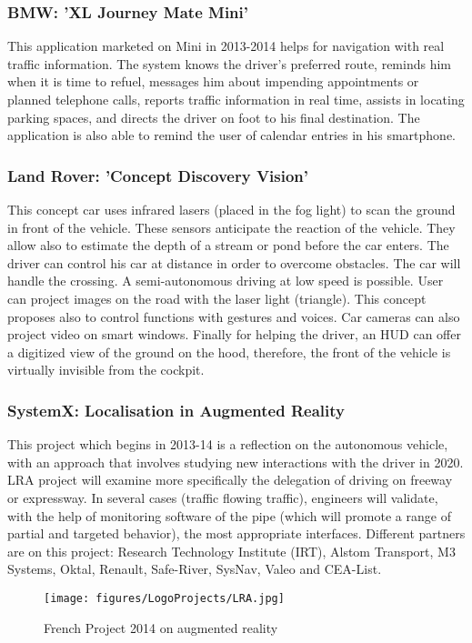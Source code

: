\documentclass[a4paper]{article}
\begin{document}
\subsubsection{BMW: 'XL Journey Mate Mini'}

This application marketed on Mini in 2013-2014 helps for navigation with real traffic information. The system knows the driver's preferred route, reminds him when it is time to refuel, messages him about impending appointments or planned telephone calls, reports traffic information in real time, assists in locating parking spaces, and directs the driver on foot to his final destination. The application is also able to remind the user of calendar entries in his smartphone. 

\subsubsection{Land Rover: 'Concept Discovery Vision'}

This concept car uses infrared lasers (placed in the fog light) to scan the ground in front of the vehicle. These sensors anticipate the reaction of the vehicle. They allow also to estimate the depth of a stream or pond before the car enters. The driver can control his car at distance in order to overcome obstacles.  The car will handle the crossing. A semi-autonomous driving at low speed is possible. User can project images on the road with the laser light (triangle). This concept proposes also to control functions with gestures and voices. Car cameras can also project video on smart windows. Finally for helping the driver, an HUD can offer a digitized view of the ground on the hood, therefore, the front of the vehicle is virtually invisible from the cockpit.

\subsubsection{SystemX: Localisation in Augmented Reality}

This project which begins in 2013-14 is a reflection on the autonomous vehicle, with an approach that involves studying new interactions with the driver in 2020. LRA project will examine more specifically the delegation of driving on freeway or expressway. In several cases (traffic flowing traffic), engineers will validate, with the help of monitoring software of the pipe (which will promote a range of partial and targeted behavior), the most appropriate interfaces. Different partners are on this project: Research Technology Institute (IRT), Alstom Transport, M3 Systems, Oktal, Renault, Safe-River, SysNav, Valeo and CEA-List.
\begin{figure}[!htb]
\begin{center}
\texttt{[image: figures/LogoProjects/LRA.jpg]}
\caption{French Project 2014 on augmented reality}
\end{center}
\end{figure}
\end{document}

